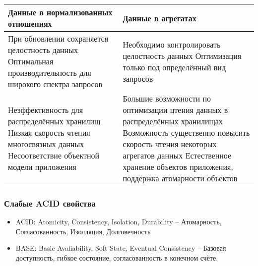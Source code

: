 \documentclass{article}
\begin{document}
\begin{centering}
\begin{tabular}{|m{15em}|m{15em}|}
        \hline
        Данные в нормализованных отношениях & Данные в агрегатах\\
        \hline
        \cellcolor{green!25}
        При обновлении сохраняется целостность данных
        \newline Оптимальная производительность для широкого спектра запросов
        &
        \cellcolor{red!25}
        Необходимо контролировать целостность данных
        \newline Оптимизация только под определённый вид запросов \\ 
        \hline
        \cellcolor{red!25}
        Неэффективность для распределённых хранилищ
        \newline Низкая скорость чтения многосвязных данных
        \newline Несоответствие объектной модели приложения 
        &
        \cellcolor{green!25}
        Большие возможности по оптимизации цтения данных в распределённых хранилищах
        \newline Возможность существенно повысить скорость чтения некоторых агрегатов данных
        \newline Естественное хранение объектов приложения, поддержка атомарности объектов\\  
        \hline
\end{tabular}
\end{centering}

\subsubsection{Слабые ACID свойства}

\begin{itemize}
    \item ACID: Atomicity, Consistency, Isolation, Durability -- 
    \newline Атомарность, Согласованность, Изолляция, Долговечность
    \item BASE: Basic Avaliability, Soft State, Eventual Consistency --
    \newline Базовая доступность, гибкое состояние, согласованность в конечном счёте.
\end{itemize}
\end{document}
